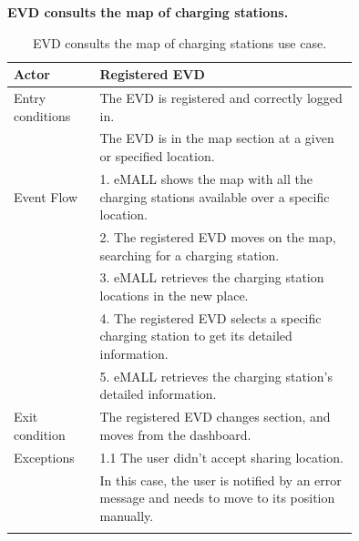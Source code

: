 \textbf{EVD consults the map of charging stations.}
\begin{center}
    \begin{longtable}{lp{0.75\linewidth}}
        \hline
        Actor            & Registered EVD                                                                                     \\
        \hline
        Entry conditions & The EVD is registered and correctly logged in.                                                     \\
        & The EVD is in the map section at a given or specified location.                                    \\
        \hline
        Event Flow       & 1. eMALL shows the map with all the charging stations available over a specific location.          \\
        & 2. The registered EVD moves on the map, searching for a charging station.                          \\
        & 3. eMALL retrieves the charging station locations in the new place.                                \\
        & 4. The registered EVD selects a specific charging station to get its detailed information.         \\
        & 5. eMALL retrieves the charging station's detailed information.                                    \\
        \hline
        Exit condition   & The registered EVD changes section, and moves from the dashboard.                                  \\
        \hline
        Exceptions       & 1.1 The user didn’t accept sharing location.                                                       \\
        & In this case, the user is notified by an error message and needs to move to its position manually. \\
        \hline
        \caption{EVD consults the map of charging stations use case.}
        \label{tab: EVD_map_charging_stations_use_case}
    \end{longtable}
\end{center}

